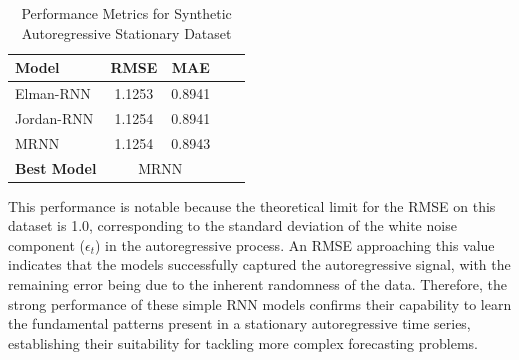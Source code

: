 \documentclass[conference, 10pt]{IEEEtran}
\begin{document}
\begin{table}[H]
    \centering
    \begin{tabular}{|l|c|c|c|c|}
        \hline
        \textbf{Model}& \textbf{RMSE} & \textbf{MAE} \\ 
        \hline
        Elman-RNN & 1.1253 & 0.8941 \\
        \hline
        Jordan-RNN & 1.1254 & 0.8941 \\
        \hline
        MRNN & 1.1254 & 0.8943 \\
        \hline
        \textbf{Best Model} &\multicolumn{2}{c|}{{MRNN}} \\ 
        \hline
    \end{tabular}
    \vspace{4pt}
    \caption{Performance Metrics for Synthetic Autoregressive Stationary Dataset}
    \label{tab:results_ar1}
\end{table}

This performance is notable because the theoretical limit for the RMSE on this dataset is 1.0, corresponding to the
standard deviation of the white noise component ($\epsilon_t$) in the autoregressive process. An RMSE approaching this
value indicates that the models successfully captured the autoregressive signal, with the remaining error being due to
the inherent randomness of the data. Therefore, the strong performance of these simple RNN models confirms their
capability to learn the fundamental patterns present in a stationary autoregressive time series, establishing their
suitability for tackling more complex forecasting problems.
\end{document}
